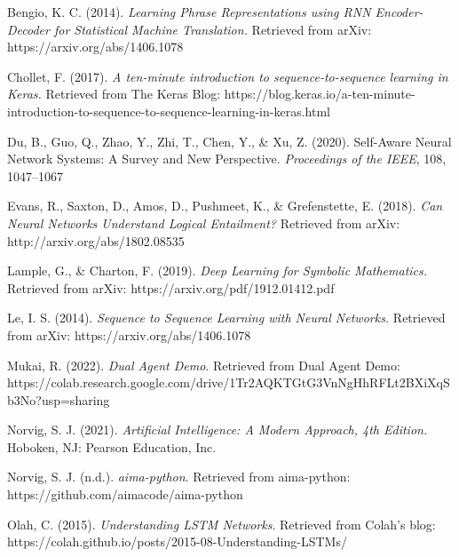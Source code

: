 \documentclass[
]{article}
\begin{document}
Bengio, K. C. (2014). \emph{Learning Phrase Representations using RNN
Encoder-Decoder for Statistical Machine Translation.} Retrieved from
arXiv: https://arxiv.org/abs/1406.1078

Chollet, F. (2017). \emph{A ten-minute introduction to
sequence-to-sequence learning in Keras.} Retrieved from The Keras Blog:
https://blog.keras.io/a-ten-minute-introduction-to-sequence-to-sequence-learning-in-keras.html

Du, B., Guo, Q., Zhao, Y., Zhi, T., Chen, Y., \& Xu, Z. (2020).
Self-Aware Neural Network Systems: A Survey and New Perspective.
\emph{Proceedings of the IEEE}, 108, 1047--1067

Evans, R., Saxton, D., Amos, D., Pushmeet, K., \& Grefenstette, E.
(2018). \emph{Can Neural Networks Understand Logical Entailment?}
Retrieved from arXiv: http://arxiv.org/abs/1802.08535

Lample, G., \& Charton, F. (2019). \emph{Deep Learning for Symbolic
Mathematics.} Retrieved from arXiv: https://arxiv.org/pdf/1912.01412.pdf

Le, I. S. (2014). \emph{Sequence to Sequence Learning with Neural
Networks.} Retrieved from arXiv: https://arxiv.org/abs/1406.1078

Mukai, R. (2022). \emph{Dual Agent Demo}. Retrieved from Dual Agent
Demo:
https://colab.research.google.com/drive/1Tr2AQKTGtG3VnNgHhRFLt2BXiXqSb3No?usp=sharing

Norvig, S. J. (2021). \emph{Artificial Intelligence: A Modern Approach,
4th Edition.} Hoboken, NJ: Pearson Education, Inc.

Norvig, S. J. (n.d.). \emph{aima-python}. Retrieved from aima-python:
https://github.com/aimacode/aima-python

Olah, C. (2015). \emph{Understanding LSTM Networks}. Retrieved from
Colah's blog: https://colah.github.io/posts/2015-08-Understanding-LSTMs/
\end{document}
